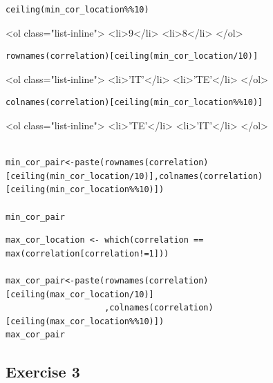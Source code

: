 \documentclass[a4paper,12pt]{article}
\begin{document}
\begin{framed} \begin{verbatim}
ceiling(min_cor_location%%10)
\end{verbatim}\end{framed} 


<ol class="list-inline">
	<li>9</li>
	<li>8</li>
</ol>




\begin{framed} \begin{verbatim}
rownames(correlation)[ceiling(min_cor_location/10)]
\end{verbatim}\end{framed} 


<ol class="list-inline">
	<li>'IT'</li>
	<li>'TE'</li>
</ol>




\begin{framed} \begin{verbatim}
colnames(correlation)[ceiling(min_cor_location%%10)]
\end{verbatim}\end{framed} 


<ol class="list-inline">
	<li>'TE'</li>
	<li>'IT'</li>
</ol>




\begin{framed} \begin{verbatim}

min_cor_pair<-paste(rownames(correlation)[ceiling(min_cor_location/10)],colnames(correlation)[ceiling(min_cor_location%%10)])

min_cor_pair

\end{verbatim}\end{framed} 


\begin{framed} \begin{verbatim}
max_cor_location <- which(correlation == max(correlation[correlation!=1]))

max_cor_pair<-paste(rownames(correlation)[ceiling(max_cor_location/10)]
                    ,colnames(correlation)[ceiling(max_cor_location%%10)])
max_cor_pair

\end{verbatim}\end{framed} 

\newpage 
\subsection*{Exercise 3}
\end{document}
